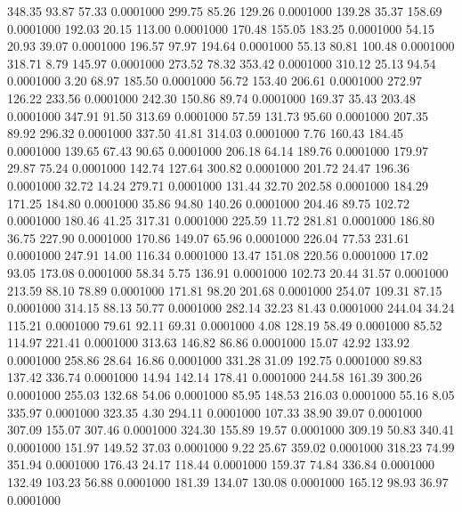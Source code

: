  348.35   93.87   57.33   0.0001000
 299.75   85.26  129.26   0.0001000
 139.28   35.37  158.69   0.0001000
 192.03   20.15  113.00   0.0001000
 170.48  155.05  183.25   0.0001000
  54.15   20.93   39.07   0.0001000
 196.57   97.97  194.64   0.0001000
  55.13   80.81  100.48   0.0001000
 318.71    8.79  145.97   0.0001000
 273.52   78.32  353.42   0.0001000
 310.12   25.13   94.54   0.0001000
   3.20   68.97  185.50   0.0001000
  56.72  153.40  206.61   0.0001000
 272.97  126.22  233.56   0.0001000
 242.30  150.86   89.74   0.0001000
 169.37   35.43  203.48   0.0001000
 347.91   91.50  313.69   0.0001000
  57.59  131.73   95.60   0.0001000
 207.35   89.92  296.32   0.0001000
 337.50   41.81  314.03   0.0001000
   7.76  160.43  184.45   0.0001000
 139.65   67.43   90.65   0.0001000
 206.18   64.14  189.76   0.0001000
 179.97   29.87   75.24   0.0001000
 142.74  127.64  300.82   0.0001000
 201.72   24.47  196.36   0.0001000
  32.72   14.24  279.71   0.0001000
 131.44   32.70  202.58   0.0001000
 184.29  171.25  184.80   0.0001000
  35.86   94.80  140.26   0.0001000
 204.46   89.75  102.72   0.0001000
 180.46   41.25  317.31   0.0001000
 225.59   11.72  281.81   0.0001000
 186.80   36.75  227.90   0.0001000
 170.86  149.07   65.96   0.0001000
 226.04   77.53  231.61   0.0001000
 247.91   14.00  116.34   0.0001000
  13.47  151.08  220.56   0.0001000
  17.02   93.05  173.08   0.0001000
  58.34    5.75  136.91   0.0001000
 102.73   20.44   31.57   0.0001000
 213.59   88.10   78.89   0.0001000
 171.81   98.20  201.68   0.0001000
 254.07  109.31   87.15   0.0001000
 314.15   88.13   50.77   0.0001000
 282.14   32.23   81.43   0.0001000
 244.04   34.24  115.21   0.0001000
  79.61   92.11   69.31   0.0001000
   4.08  128.19   58.49   0.0001000
  85.52  114.97  221.41   0.0001000
 313.63  146.82   86.86   0.0001000
  15.07   42.92  133.92   0.0001000
 258.86   28.64   16.86   0.0001000
 331.28   31.09  192.75   0.0001000
  89.83  137.42  336.74   0.0001000
  14.94  142.14  178.41   0.0001000
 244.58  161.39  300.26   0.0001000
 255.03  132.68   54.06   0.0001000
  85.95  148.53  216.03   0.0001000
  55.16    8.05  335.97   0.0001000
 323.35    4.30  294.11   0.0001000
 107.33   38.90   39.07   0.0001000
 307.09  155.07  307.46   0.0001000
 324.30  155.89   19.57   0.0001000
 309.19   50.83  340.41   0.0001000
 151.97  149.52   37.03   0.0001000
   9.22   25.67  359.02   0.0001000
 318.23   74.99  351.94   0.0001000
 176.43   24.17  118.44   0.0001000
 159.37   74.84  336.84   0.0001000
 132.49  103.23   56.88   0.0001000
 181.39  134.07  130.08   0.0001000
 165.12   98.93   36.97   0.0001000
